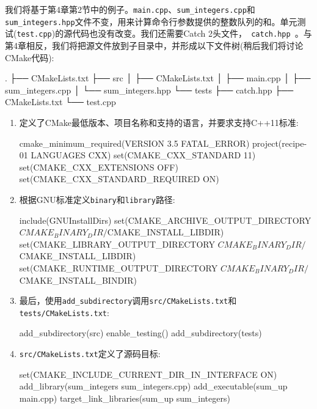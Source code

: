 
我们将基于第4章第2节中的例子。\texttt{main.cpp}、\texttt{sum\_integers.cpp}和\texttt{sum\_integers.hpp}文件不变，用来计算命令行参数提供的整数队列的和。单元测试(\texttt{test.cpp})的源代码也没有改变。我们还需要Catch 2头文件，\texttt{ catch.hpp }。与第4章相反，我们将把源文件放到子目录中，并形成以下文件树(稍后我们将讨论CMake代码):

\begin{codebox}[shell]
.
├── CMakeLists.txt
├── src
│     ├── CMakeLists.txt
│     ├── main.cpp
│     ├── sum_integers.cpp
│     └── sum_integers.hpp
└── tests
      ├── catch.hpp
      ├── CMakeLists.txt
      └── test.cpp
\end{codebox}


\begin{enumerate}
\item 定义了CMake最低版本、项目名称和支持的语言，并要求支持C++11标准:

\begin{codebox}[cmake]
cmake_minimum_required(VERSION 3.5 FATAL_ERROR)
project(recipe-01 LANGUAGES CXX)
set(CMAKE_CXX_STANDARD 11)
set(CMAKE_CXX_EXTENSIONS OFF)
set(CMAKE_CXX_STANDARD_REQUIRED ON)
\end{codebox}

\item 根据GNU标准定义\texttt{binary}和\texttt{library}路径:

\begin{codebox}[cmake]
include(GNUInstallDirs)
set(CMAKE_ARCHIVE_OUTPUT_DIRECTORY
    ${CMAKE_BINARY_DIR}/${CMAKE_INSTALL_LIBDIR})
set(CMAKE_LIBRARY_OUTPUT_DIRECTORY
    ${CMAKE_BINARY_DIR}/${CMAKE_INSTALL_LIBDIR})
set(CMAKE_RUNTIME_OUTPUT_DIRECTORY
    ${CMAKE_BINARY_DIR}/${CMAKE_INSTALL_BINDIR})
\end{codebox}

\item 最后，使用\texttt{add\_subdirectory}调用\texttt{src/CMakeLists.txt}和\texttt{tests/CMakeLists.txt}:

\begin{codebox}[cmake]
add_subdirectory(src)
enable_testing()
add_subdirectory(tests)
\end{codebox}

\item \texttt{src/CMakeLists.txt}定义了源码目标:

\begin{codebox}[cmake]
set(CMAKE_INCLUDE_CURRENT_DIR_IN_INTERFACE ON)
add_library(sum_integers sum_integers.cpp)
add_executable(sum_up main.cpp)
target_link_libraries(sum_up sum_integers)
\end{codebox}


\end{enumerate}
